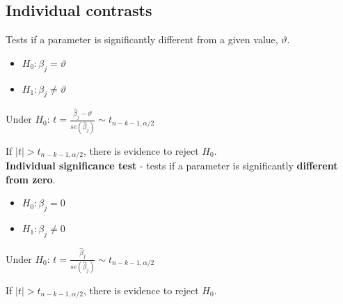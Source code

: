 \documentclass[10pt, a4paper, landscape]{extarticle}
\begin{document}
\begin{multicols}{3}
	\subsection*{Individual contrasts}
		Tests if a parameter is significantly different from a given value, $\vartheta$.
		\begin{itemize}[leftmargin=*]
			\item $H_0: \beta_j = \vartheta$
			\item $H_1: \beta_j \neq \vartheta$
		\end{itemize}
		\begin{center}
			Under $H_0$: \quad
			$t = \frac{\hat{\beta}_j - \vartheta}{se(\hat{\beta}_j)} \sim t_{n-k-1, \alpha/2}$
		\end{center}
		If $\mid t \mid > t_{n-k-1, \alpha/2}$, there is evidence to reject $H_0$.
		\\ \textbf{Individual significance test} - tests if a parameter is significantly \textbf{different from zero}.
		\begin{itemize}[leftmargin=*]
			\item $H_0: \beta_j = 0$
			\item $H_1: \beta_j \neq 0$
		\end{itemize}
		\begin{center}
			Under $H_0$: \quad
			$t = \frac{\hat{\beta}_j}{se(\hat{\beta}_j)} \sim t_{n-k-1, \alpha/2}$
		\end{center}
		If $\mid t \mid > t_{n-k-1, \alpha/2}$, there is evidence to reject $H_0$.

\end{multicols}
\end{document}
